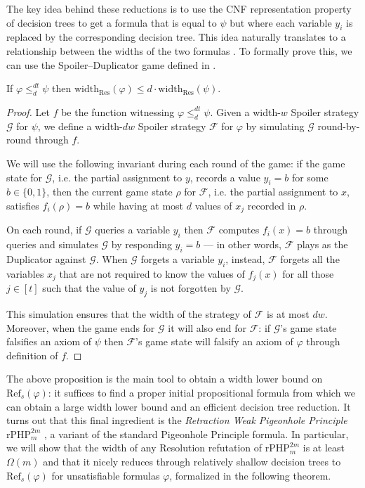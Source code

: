 The key idea behind these reductions is to use the CNF representation property of decision trees to get a formula that is equal to $\psi$ but where each variable $y_i$ is replaced by the corresponding decision tree. This idea naturally translates to a relationship between the widths of the two formulas \cite{alg_nphard,atserias_dalmau}. To formally prove this, we can use the Spoiler--Duplicator game defined in .

\begin{proposition}
    \label{prop:width_reduction}
    If $\varphi \leq^{dt}_d \psi$ then $\mathrm{width}_{\mathrm{Res}}(\varphi) \leq d \cdot \mathrm{width}_{\mathrm{Res}}(\psi)$.
\end{proposition}

\begin{proof}
    Let $f$ be the function witnessing $\varphi \leq_d^{dt} \psi$. Given a width-$w$ Spoiler strategy $\mathcal{G}$ for $\psi$, we define a width-$dw$ Spoiler strategy $\mathcal{F}$ for $\varphi$ by simulating $\mathcal{G}$ round-by-round through $f$.

    We will use the following invariant during each round of the game: if the game state for $\mathcal{G}$, i.e. the partial assignment to $y$, records a value $y_i = b$ for some $b \in \{0, 1\}$, then the current game state $\rho$ for $\mathcal{F}$, i.e. the partial assignment to $x$, satisfies $f_i(\rho) = b$ while having at most $d$ values of $x_j$ recorded in $\rho$.
    
    On each round, if $\mathcal{G}$ queries a variable $y_i$ then $\mathcal{F}$ computes $f_i(x) = b$ through queries and simulates $\mathcal{G}$ by responding $y_i = b$ --- in other words, $\mathcal{F}$ plays as the Duplicator against $\mathcal{G}$. When $\mathcal{G}$ forgets a variable $y_i$, instead, $\mathcal{F}$ forgets all the variables $x_j$ that are not required to know the values of $f_j(x)$ for all those $j \in [t]$ such that the value of $y_j$ is not forgotten by $\mathcal{G}$.

    This simulation ensures that the width of the strategy of $\mathcal{F}$ is at most $dw$. Moreover, when the game ends for $\mathcal{G}$ it will also end for $\mathcal{F}$: if $\mathcal{G}$'s game state falsifies an axiom of $\psi$ then $\mathcal{F}$'s game state will falsify an axiom of $\varphi$ through definition of $f$.
\end{proof}

The above proposition is the main tool to obtain a width lower bound on $\mathrm{Ref}_s(\varphi)$: it suffices to find a proper initial propositional formula from which we can obtain a large width lower bound and an efficient decision tree reduction. It turns out that this final ingredient is the \textit{Retraction Weak Pigeonhole Principle} $\mathrm{rPHP}_{m}^{2m}$ \cite{rphp_1, rphp_2}, a variant of the standard Pigeonhole Principle formula. In particular, we will show that the width of any Resolution refutation of $\mathrm{rPHP}^{2m}_m$ is at least $\Omega(m)$ and that it nicely reduces through relatively shallow decision trees to $\mathrm{Ref}_s(\varphi)$ for unsatisfiable formulas $\varphi$, formalized in the following theorem.

